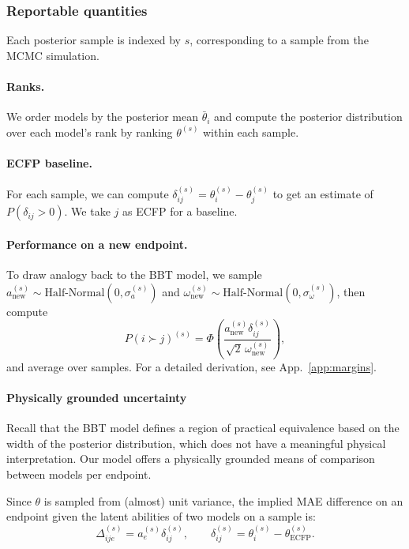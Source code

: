 \documentclass{article}
\begin{document}
\subsubsection{Reportable quantities}
Each posterior sample is indexed by $s$, corresponding to a sample from the MCMC simulation.

\paragraph{Ranks.} We order models by the posterior mean $\bar{\theta}_i$ and compute the posterior distribution over each model's rank by ranking $\theta^{(s)}$ within each sample.

\paragraph{ECFP baseline.}For each sample, we can compute $\delta_{ij}^{(s)} = \theta_i^{(s)} - \theta_j^{(s)}$ to get an estimate of $P(\delta_{ij} > 0)$. We take $j$ as ECFP for a baseline.

\paragraph{Performance on a new endpoint.} To draw analogy back to the BBT model, we sample $a_{\text{new}}^{(s)} \sim \text{Half-Normal}(0, \sigma_a^{(s)})$ and
$\omega_{\text{new}}^{(s)} \sim \text{Half-Normal}(0, \sigma_\omega^{(s)})$, then compute 
\begin{equation}
  P(i \succ j)^{(s)}
  = \Phi\!\left( \frac{a_{\text{new}}^{(s)} \delta_{ij}^{(s)}}
                      {\sqrt{2}\, \omega_{\text{new}}^{(s)}} \right),
  \label{eq:newendpoint}
\end{equation}
and average over samples. For a detailed derivation, see App.~\ref{app:margins}.

\paragraph{Physically grounded uncertainty} Recall that the BBT model defines a region of practical equivalence based on the width of the posterior distribution, which does not have a meaningful physical interpretation. Our model offers a physically grounded means of comparison between models per endpoint.

Since $\theta$ is sampled from (almost) unit variance, the implied MAE difference on an endpoint given the latent abilities of two models on a sample is:
\begin{equation}
    \Delta_{ije}^{(s)} = a_e^{(s)}\delta_{ij}^{(s)}, \qquad \delta_{ij}^{(s)} = \theta_i^{(s)} - \theta_{\text{ECFP}}^{(s)}.
\end{equation}
\end{document}
